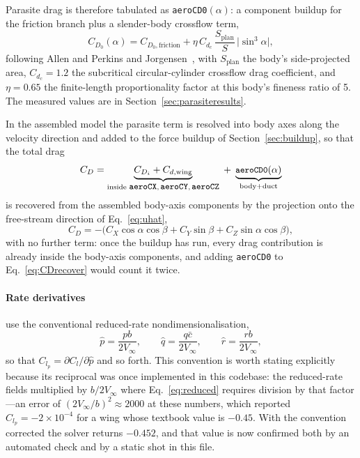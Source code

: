 \documentclass[11pt,a4paper]{article}
\newcommand{\varid}[1]{\texttt{\small #1}}
\begin{document}
Parasite drag is therefore tabulated as \varid{aeroCD0}$(\alpha)$: a
component buildup for the friction branch plus a slender-body crossflow
term,
\begin{equation}
C_{D_0}(\alpha) = C_{D_0,\mathrm{friction}}
 + \eta\,C_{d_c}\,\frac{S_{\mathrm{plan}}}{S}\,\lvert\sin^3\alpha\rvert ,
\label{eq:cd0}
\end{equation}
following Allen and Perkins and Jorgensen~\cite{allenPerkins1951,
jorgensen1977}, with $S_{\mathrm{plan}}$ the body's side-projected area,
$C_{d_c} = 1.2$ the subcritical circular-cylinder crossflow drag
coefficient, and $\eta = 0.65$ the finite-length proportionality factor
at this body's fineness ratio of 5. The measured values are in
Section~\ref{sec:parasiteresults}.

In the assembled model the parasite term is resolved into body axes along
the velocity direction and added to the force buildup of
Section~\ref{sec:buildup}, so that the total drag
\begin{equation}
C_D = \underbrace{C_{D_i} + C_{d,\mathrm{wing}}}_{\text{inside }
\varid{aeroCX},\, \varid{aeroCY},\, \varid{aeroCZ}} \;+\;
\underbrace{\varid{aeroCD0}(\alpha)}_{\text{body{+}duct}}
\end{equation}
is recovered from the assembled body-axis components by the projection
onto the free-stream direction of Eq.~\eqref{eq:uhat},
\begin{equation}
C_D = -\bigl(C_X \cos\alpha \cos\beta + C_Y \sin\beta
+ C_Z \sin\alpha\cos\beta\bigr),
\label{eq:CDrecover}
\end{equation}
with no further term: once the buildup has run, every drag contribution
is already inside the body-axis components, and adding \varid{aeroCD0}
to Eq.~\eqref{eq:CDrecover} would count it twice.

\paragraph{Rate derivatives} use the conventional reduced-rate
nondimensionalisation,
\begin{equation}
\hat p = \frac{pb}{2V_\infty}, \qquad
\hat q = \frac{q\bar c}{2V_\infty}, \qquad
\hat r = \frac{rb}{2V_\infty},
\label{eq:reduced}
\end{equation}
so that $C_{l_p} = \partial C_l / \partial \hat p$ and so forth. This
convention is worth stating explicitly because its reciprocal was once
implemented in this codebase: the reduced-rate fields multiplied by
$b/2V_\infty$ where Eq.~\eqref{eq:reduced} requires division by that
factor---an error of $(2V_\infty/b)^2 \approx 2000$ at these
numbers, which reported $C_{l_p} = -2\times 10^{-4}$ for a wing whose
textbook value is $-0.45$. With the convention corrected the solver
returns $-0.452$, and that value is now confirmed both by an automated check and by
a static shot in this file.
\end{document}
